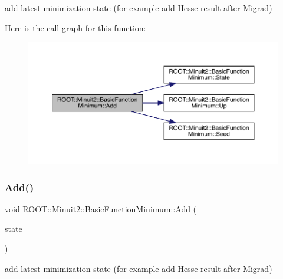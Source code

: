 add latest minimization state (for example add Hesse result after Migrad) 

Here is the call graph for this function\+:
\nopagebreak
\begin{figure}[H]
\begin{center}
\leavevmode
\includegraphics[width=350pt]{de/d25/classROOT_1_1Minuit2_1_1BasicFunctionMinimum_abd32f932e7a26883723b33c4a1402a85_cgraph}
\end{center}
\end{figure}
\mbox{\label{classROOT_1_1Minuit2_1_1BasicFunctionMinimum_abd32f932e7a26883723b33c4a1402a85}} 
\subsubsection{\texorpdfstring{Add()}{Add()}\hspace{0.1cm}{\footnotesize\ttfamily [2/2]}}
{\footnotesize\ttfamily void R\+O\+O\+T\+::\+Minuit2\+::\+Basic\+Function\+Minimum\+::\+Add (\begin{DoxyParamCaption}\item[{const \mbox{\hyperlink{classROOT_1_1Minuit2_1_1MinimumState}{Minimum\+State}} \&}]{state }\end{DoxyParamCaption})\hspace{0.3cm}{\ttfamily [inline]}}



add latest minimization state (for example add Hesse result after Migrad) 


